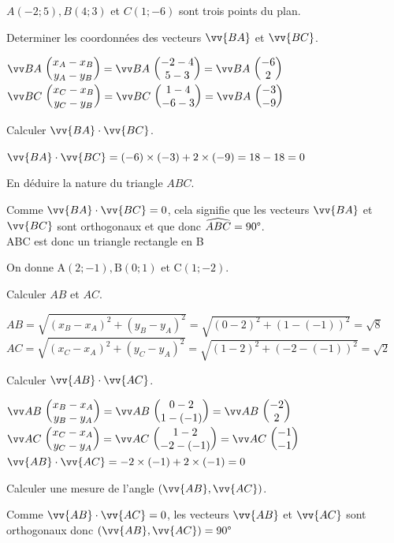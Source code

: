 \documentclass[11pt,a4paper]{article}  %
\begin{document}
\exercice{}
$A(-2 ; 5), B(4 ; 3)$ et $C(1 ;-6)$ sont trois points du plan.
\begin{enumMet}
	\item Determiner les coordonnées des vecteurs $\vv{B A}$ et $\vv{B C}$.
	\begin{corrBox}
		$\Coord{BA}{x_A-x_B}{y_A-y_B}=\Coord{BA}{-2-4}{5-3}=\Coord{BA}{-6}{2}$\\
		$\Coord{BC}{x_C-x_B}{y_C-y_B}=\Coord{BC}{1-4}{-6-3}=\Coord{BA}{-3}{-9}$
	\end{corrBox}
	\item Calculer $\vv{B A} \cdot \vv{B C}$.
	\begin{corrBox}
		$\vv{B A} \cdot \vv{B C}=(-6)\times(-3)+2\times(-9)=18-18=0$
	\end{corrBox}
	\item En déduire la nature du triangle $A B C$.
	\begin{corrBox}
		Comme $\vv{B A} \cdot \vv{B C}=0$, cela signifie que les vecteurs $\vv{BA}$ et $\vv{BC}$ sont orthogonaux et que donc $\widehat{ABC}=90\degree$.\\
		ABC est donc un triangle rectangle en B
	\end{corrBox}
\end{enumMet}

\exercice{}
On donne $\mathrm{A}(2 ;-1), \mathrm{B}(0 ; 1)$ et $\mathrm{C}(1 ;-2)$.
\begin{enumMet}
	\item Calculer $A B$ et $A C$.
	\begin{corrBox}
		$AB=\sqrt{(x_B-x_A)^2+(y_B-y_A)^2}=\sqrt{(0-2)^2+(1-(-1))^2}=\sqrt{8}$\\
		$AC=\sqrt{(x_C-x_A)^2+(y_C-y_A)^2}=\sqrt{(1-2)^2+(-2-(-1))^2}=\sqrt{2}$\\
	\end{corrBox}
	\item Calculer $\vv{AB} \cdot \vv{AC}$.
	\begin{corrBox}
		$\Coord{AB}{x_B-x_A}{y_B-y_A}=\Coord{AB}{0-2}{1-(-1)}=\Coord{AB}{-2}{2}$\\
		$\Coord{AC}{x_C-x_A}{y_C-y_A}=\Coord{AC}{1-2}{-2-(-1)}=\Coord{AC}{-1}{-1}$\\
		$\vv{AB} \cdot \vv{AC}=-2\times(-1)+2\times(-1)=0$
	\end{corrBox}
	\item Calculer une mesure de l'angle $(\vv{AB}, \vv{AC})$.
	\begin{corrBox}
		Comme $\vv{AB} \cdot \vv{AC}=0$, les vecteurs $\vv{AB}$ et $\vv{AC}$ sont orthogonaux donc $(\vv{AB}, \vv{AC})=90\degree$
	\end{corrBox}
\end{enumMet}
\end{document}

